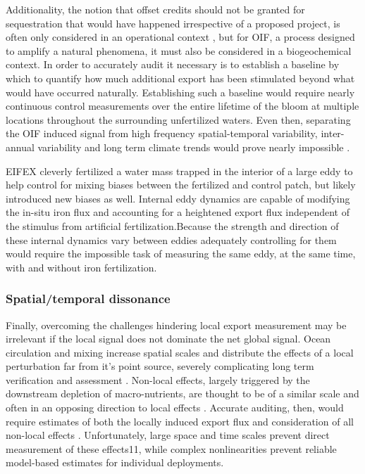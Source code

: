 Additionality, the notion that offset credits should not be granted for sequestration that would have happened irrespective of a proposed project, is often only considered in an operational context \parencite{LeinenBuildingrelationshipsscientists2008}, but for OIF, a process designed to amplify a natural phenomena, it must also be considered in a biogeochemical context. In order to accurately audit it necessary is to establish a baseline by which to quantify how much additional export has been stimulated beyond what would have occurred naturally. Establishing such a baseline would require nearly continuous control measurements over the entire lifetime of the bloom at multiple locations throughout the surrounding unfertilized waters. Even then, separating the OIF induced signal from high frequency spatial-temporal variability, inter-annual variability and long term climate trends would prove nearly impossible \parencite{CullenPredictingverifyingintended2008}.

EIFEX \parencite{SmetacekDeepcarbonexport2012} cleverly fertilized a water mass trapped in the interior of a large eddy to help control for mixing biases between the fertilized and control patch, but likely introduced new biases as well. Internal eddy dynamics are capable of modifying the in-situ iron flux \parencite{McGillicuddyMechanismsPhysicalBiologicalBiogeochemicalInteraction2016} and accounting for a heightened export flux independent of the stimulus from artificial fertilization.Because the strength and direction of these internal dynamics vary between eddies \parencite{GaubeSatelliteObservationsMesoscale2014} adequately controlling for them would require the impossible task of measuring the same eddy, at the same time, with and without iron fertilization.  

\subsubsection{Spatial/temporal dissonance}

Finally, overcoming the challenges hindering local export measurement may be irrelevant if the local signal does not dominate the net global signal. Ocean circulation and mixing increase spatial scales and distribute the effects of a local perturbation far from it’s point source, severely complicating long term verification and assessment \parencite{BuesselerOceanIronFertilization2008}. Non-local effects, largely triggered by the downstream depletion of macro-nutrients, are thought to be of a similar scale and often in an opposing direction to local effects \parencite{GnanadesikanEffectspatchyocean2003, AumontGlobalizingresultsocean2006, OschliesSideeffectsaccounting2010, SarmientoThreedimensionalsimulationsimpact1991}. Accurate auditing, then, would require estimates of both the locally induced export flux and consideration of all non-local effects \parencite{YoonOceanIronFertilization2016}. Unfortunately, large space and time scales prevent direct measurement of these effects11, while complex nonlinearities prevent reliable model-based estimates for individual deployments.

